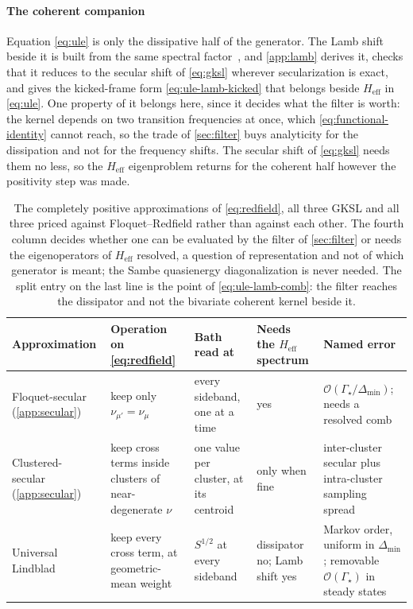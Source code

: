 \documentclass[a4paper,11pt]{article}
\newcommand{\eff}{\mathrm{eff}}
\begin{document}
\paragraph{The coherent companion}
Equation \eqref{eq:ule} is only the dissipative half of the generator. The Lamb shift beside it is built from the same spectral factor~\cite{Nathan2020Universal}, and \cref{app:lamb} derives it, checks that it reduces to the secular shift of \eqref{eq:gksl} wherever secularization is exact, and gives the kicked-frame form \eqref{eq:ule-lamb-kicked} that belongs beside $H_\eff$ in \eqref{eq:ule}. One property of it belongs here, since it decides what the filter is worth: the kernel depends on two transition frequencies at once, which \eqref{eq:functional-identity} cannot reach, so the trade of \cref{sec:filter} buys analyticity for the dissipation and not for the frequency shifts. The secular shift of \eqref{eq:gksl} needs them no less, so the $H_\eff$ eigenproblem returns for the coherent half however the positivity step was made.

\begin{table}[H]
  \centering\small
  \renewcommand{\arraystretch}{1.35}
  \begin{tabular}{@{}L{2.7cm}L{3.4cm}L{2.9cm}L{2.0cm}L{3.0cm}@{}}
    \toprule
    Approximation & Operation on \eqref{eq:redfield} & Bath read at & Needs the $H_\eff$ spectrum & Named error \\
    \midrule
    Floquet-secular~\cite{Davies1974,Davies1976} (\cref{app:secular})
    & keep only $\nu_{\mu'} = \nu_\mu$
    & every sideband, one at a time
    & yes
    & $\mathcal O(\Gamma_{\!\star}/\Delta_{\min})$; needs a resolved comb \\
    Clustered-secular~\cite{Farina2019Open,Trushechkin2021Unified} (\cref{app:secular})
    & keep cross terms inside clusters of near-degenerate $\nu$
    & one value per cluster, at its centroid
    & only when fine
    & inter-cluster secular plus intra-cluster sampling spread \\
    Universal Lindblad~\cite{Nathan2020Universal}
    & keep every cross term, at geometric-mean weight
    & $S^{1/2}$ at every sideband
    & dissipator no; Lamb shift yes
    & Markov order, uniform in $\Delta_{\min}$; removable $\mathcal O(\Gamma_{\!\star})$ in steady states \\
    \bottomrule
  \end{tabular}
  \caption{The completely positive approximations of \eqref{eq:redfield}, all three GKSL and all three priced against Floquet--Redfield rather than against each other. The fourth column decides whether one can be evaluated by the filter of \cref{sec:filter} or needs the eigenoperators of $H_\eff$ resolved, a question of representation and not of which generator is meant; the Sambe quasienergy diagonalization is never needed. The split entry on the last line is the point of \eqref{eq:ule-lamb-comb}: the filter reaches the dissipator and not the bivariate coherent kernel beside it.}
  \label{tab:closures}
\end{table}
\end{document}
